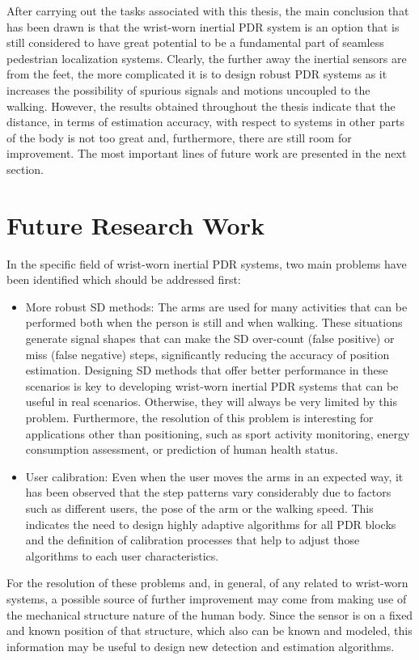 After carrying out the tasks associated with this thesis, the main conclusion that has been drawn is that the wrist-worn inertial PDR system is an option that is still considered to have great potential to be a fundamental part of seamless pedestrian localization systems.
Clearly, the further away the inertial sensors are from the feet, the more complicated it is to design robust PDR systems as it increases the possibility of spurious signals and motions uncoupled to the walking.
However, the results obtained throughout the thesis indicate that the distance, in terms of estimation accuracy, with respect to systems in other parts of the body is not too great and, furthermore, there are still room for improvement.
The most important lines of future work are presented in the next section.		
\section{Future Research Work}
\label{sec:10_2_future}
In the specific field of wrist-worn inertial PDR systems, two main problems have been identified which should be addressed first:
\begin{itemize}
	\item More robust SD methods: 
	The arms are used for many activities that can be performed both when the person is still and when walking.
	These situations generate signal shapes that can make the SD over-count (false positive) or miss (false negative) steps, significantly  reducing the accuracy of position estimation.
	Designing SD methods that offer better performance in these scenarios is key to developing wrist-worn inertial PDR systems that can be useful in real scenarios.
	Otherwise, they will always be very limited by this problem.
	Furthermore, the resolution of this problem is interesting for applications other than positioning, such as sport activity monitoring, energy consumption assessment, or prediction of human health status.	
	\item User calibration:
	Even when the user moves the arms in an expected way, it has been observed that the step patterns vary considerably due to factors such as different users, the pose of the arm or the walking speed.
	This indicates the need to design highly adaptive algorithms for all PDR blocks and the definition of calibration processes that help to adjust those algorithms to each user characteristics.	
\end{itemize}
For the resolution of these problems and, in general, of any related to wrist-worn systems, a possible source of further improvement may come from making use of the mechanical structure nature of the human body. 
Since the sensor is on a fixed and known position of that structure, which also can be known and modeled, this information may be useful to design new detection and estimation algorithms.

